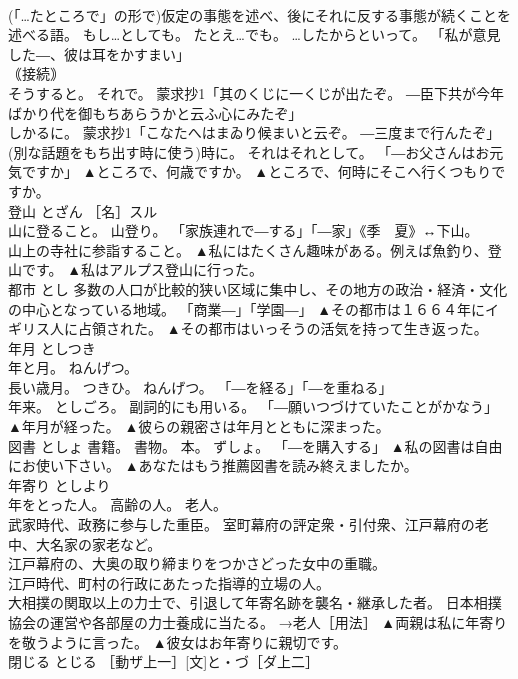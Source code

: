 \documentclass[8pt]{extreport}
\begin{document}
\begin{CJK}{UTF8}{min}
\\	(「…たところで」の形で)仮定の事態を述べ、後にそれに反する事態が続くことを述べる語。 もし…としても。 たとえ…でも。 …したからといって。 「私が意見した―、彼は耳をかすまい」 
\\	｟接続｠ 
\\	そうすると。 それで。 蒙求抄1「其のくじに一くじが出たぞ。 ―臣下共が今年ばかり代を御もちあらうかと云ふ心にみたぞ」 
\\	しかるに。 蒙求抄1「こなたへはまゐり候まいと云ぞ。 ―三度まで行んたぞ」 
\\	(別な話題をもち出す時に使う)時に。 それはそれとして。 「―お父さんはお元気ですか」	▲ところで、何歳ですか。 ▲ところで、何時にそこへ行くつもりですか。
\\	登山	とざん	［名］スル 
\\	山に登ること。 山登り。 「家族連れで―する」「―家」《季　夏》↔下山。 
\\	山上の寺社に参詣すること。	▲私にはたくさん趣味がある。例えば魚釣り、登山です。 ▲私はアルプス登山に行った。
\\	都市	とし	多数の人口が比較的狭い区域に集中し、その地方の政治・経済・文化の中心となっている地域。 「商業―」「学園―」	▲その都市は１６６４年にイギリス人に占領された。 ▲その都市はいっそうの活気を持って生き返った。
\\	年月	としつき	
\\	年と月。 ねんげつ。 
\\	長い歳月。 つきひ。 ねんげつ。 「―を経る」「―を重ねる」 
\\	年来。 としごろ。 副詞的にも用いる。 「―願いつづけていたことがかなう」	▲年月が経った。 ▲彼らの親密さは年月とともに深まった。
\\	図書	としょ	書籍。 書物。 本。 ずしょ。 「―を購入する」	▲私の図書は自由にお使い下さい。 ▲あなたはもう推薦図書を読み終えましたか。
\\	年寄り	としより	
\\	年をとった人。 高齢の人。 老人。 
\\	武家時代、政務に参与した重臣。 室町幕府の評定衆・引付衆、江戸幕府の老中、大名家の家老など。 
\\	江戸幕府の、大奥の取り締まりをつかさどった女中の重職。 
\\	江戸時代、町村の行政にあたった指導的立場の人。 
\\	大相撲の関取以上の力士で、引退して年寄名跡を襲名・継承した者。 日本相撲協会の運営や各部屋の力士養成に当たる。 →老人［用法］	▲両親は私に年寄りを敬うように言った。 ▲彼女はお年寄りに親切です。
\\	閉じる	とじる	［動ザ上一］[文]と・づ［ダ上二］ 

\end{CJK}
\end{document}
